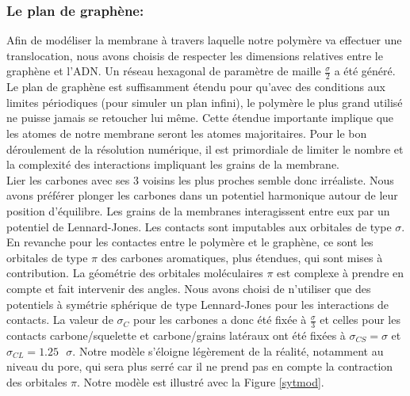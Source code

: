 \documentclass[a4paper,11pt]{article}
\begin{document}
\subsubsection*{Le plan de graphène:}

Afin de modéliser la membrane à travers laquelle notre polymère va effectuer une translocation, nous avons choisis de respecter les dimensions relatives  entre le graphène et l'ADN. Un réseau hexagonal de paramètre de maille $\frac{\sigma}{2}$ a été généré. Le plan de graphène est suffisamment étendu pour qu'avec des conditions aux limites périodiques (pour simuler un plan infini), le polymère le plus grand utilisé ne puisse jamais se retoucher lui même. Cette étendue importante implique que les atomes de notre membrane seront les atomes majoritaires. Pour le bon déroulement de la résolution numérique, il est primordiale de limiter le nombre et la complexité des interactions impliquant les grains de la membrane.\\
 
 Lier les carbones avec ses 3 voisins les plus proches semble donc irréaliste. Nous avons préférer plonger les carbones dans un potentiel harmonique autour de leur position d'équilibre. Les grains de la membranes interagissent entre eux par un potentiel de Lennard-Jones. Les contacts sont imputables aux orbitales de type $\sigma$. En revanche pour les contactes entre le polymère et le graphène, ce sont les orbitales de type $\pi$ des carbones aromatiques, plus étendues, qui sont mises à contribution. La géométrie des orbitales moléculaires $\pi$ est complexe à prendre en compte et fait intervenir des angles. Nous avons choisi de n'utiliser que des potentiels à symétrie sphérique de type Lennard-Jones pour les interactions de contacts. La valeur de $\sigma_C$ pour les carbones a donc été fixée à $\frac{\sigma}{3}$ et celles pour les contacts carbone/squelette et carbone/grains latéraux ont été fixées à $\sigma_{CS}= \sigma $ et $\sigma_{CL}=1.25\text{ }\sigma$. Notre modèle s'éloigne légèrement de la réalité, notamment au niveau du pore, qui sera plus serré car il ne prend pas en compte la contraction des orbitales $\pi$. Notre modèle est illustré avec la Figure \ref{sytmod}.
\end{document}
